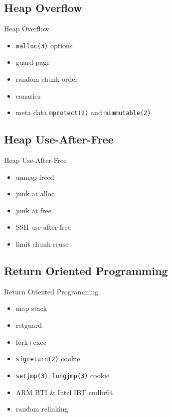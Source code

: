 \documentclass[14pt,aspectratio=169]{beamer}
\begin{document}
\subsection{Heap Overflow}
\begin{frame}{Heap Overflow}
\begin{itemize}
  \item \texttt{malloc(3)} options
  \item guard page
  \item random chunk order
  \item canaries
  \item meta data \texttt{mprotect(2)} and \texttt{mimmutable(2)}
\end{itemize}
\end{frame}

\subsection{Heap Use-After-Free}
\begin{frame}{Heap Use-After-Free}
\begin{itemize}
  \item unmap freed
  \item junk at alloc
  \item junk at free
  \item SSH use-after-free
  \item limit chunk reuse
\end{itemize}
\end{frame}

\subsection{Return Oriented Programming}
\begin{frame}{Return Oriented Programming}
\begin{itemize}
  \item map stack
  \item retguard
  \item fork+exec
  \item \texttt{sigreturn(2)} cookie
  \item \texttt{setjmp(3)}, \texttt{longjmp(3)} cookie
  \item ARM BTI \& Intel IBT endbr64
  \item random relinking
\end{itemize}
\end{frame}
\end{document}
